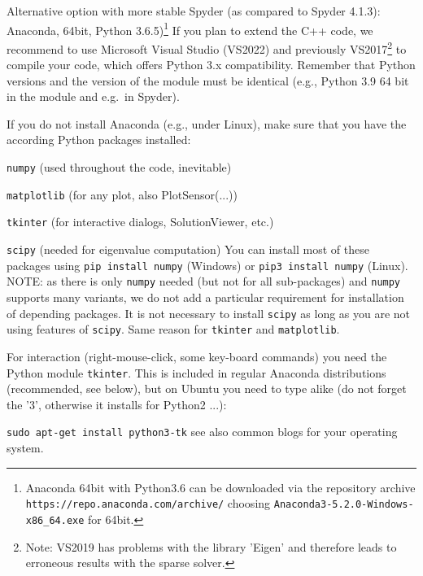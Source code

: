   \item Alternative option with more stable Spyder (as compared to Spyder 4.1.3): Anaconda, 64bit, Python 3.6.5)\footnote{Anaconda 64bit with Python3.6 can be downloaded via the repository archive \texttt{https://repo.anaconda.com/archive/} choosing \texttt{Anaconda3-5.2.0-Windows-x86\_64.exe} for 64bit.}
\ei
If you plan to extend the C++ code, we recommend to use Microsoft Visual Studio (VS2022) and previously VS2017\footnote{Note: VS2019 has problems with the library 'Eigen' and therefore leads to erroneous results with the sparse solver.} to compile your code, which offers Python 3.x compatibility.
Remember that Python versions and the version of the \codeName module must be identical (e.g., Python 3.9 64 bit  in the \codeName module and e.g.\ in Spyder).

If you do not install Anaconda (e.g., under Linux), make sure that you have the according Python packages installed:
\bi
  \item \texttt{numpy} (used throughout the code, inevitable)
  \item \texttt{matplotlib} (for any plot, also PlotSensor(...))
  \item \texttt{tkinter} (for interactive dialogs, SolutionViewer, etc.)
  \item \texttt{scipy} (needed for eigenvalue computation)
\ei
You can install most of these packages using \texttt{pip install numpy} (Windows) or \texttt{pip3 install numpy} (Linux).
NOTE: as there is only \texttt{numpy} needed (but not for all sub-packages) and \texttt{numpy} supports many variants, we do not add a particular requirement for installation of depending packages. It is not necessary to install \texttt{scipy} as long as you are not using features of \texttt{scipy}. Same reason for \texttt{tkinter} and \texttt{matplotlib}.

For interaction (right-mouse-click, some key-board commands) you need the Python module \texttt{tkinter}. This is included in regular Anaconda distributions (recommended, see below), but on Ubuntu you need to type alike (do not forget the '3', otherwise it installs for Python2 ...):
\bi
  \item[] \texttt{sudo apt-get install python3-tk}
\ei
see also common blogs for your operating system.

